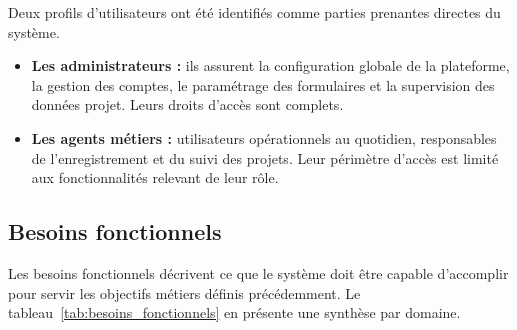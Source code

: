 Deux profils d'utilisateurs ont été identifiés comme parties
prenantes directes du système.

\begin{itemize}
    \item \textbf{Les administrateurs :} ils assurent la configuration
    globale de la plateforme, la gestion des comptes, le paramétrage
    des formulaires et la supervision des données projet. Leurs
    droits d'accès sont complets.

    \item \textbf{Les agents métiers :} utilisateurs opérationnels
    au quotidien, responsables de l'enregistrement et du suivi des
    projets. Leur périmètre d'accès est limité aux fonctionnalités
    relevant de leur rôle.
\end{itemize}

\subsection{Besoins fonctionnels}

Les besoins fonctionnels décrivent ce que le système doit être
capable d'accomplir pour servir les objectifs métiers définis
précédemment. Le tableau~\ref{tab:besoins_fonctionnels} en présente
une synthèse par domaine.

